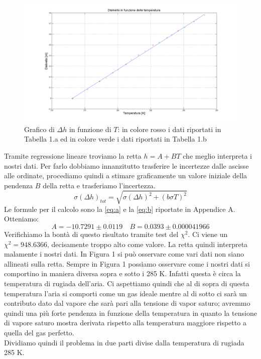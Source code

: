 \begin{figure}[H]
\centering
\includegraphics[width=\textwidth]{img/1}
\caption{Grafico di $\Delta h$ in funzione di $T$: in colore rosso i dati riportati in Tabella 1.a ed in colore verde i dati riportati in Tabella 1.b }
\end{figure}

Tramite regressione lineare troviamo la retta $h = A+BT$ che meglio interpreta i nostri dati. 
Per farlo dobbiamo innanzitutto trasferire le incertezze dalle ascisse alle ordinate, procediamo quindi a stimare graficamente un valore iniziale della pendenza $B$ della retta e trasferiamo l'incertezza.
\begin{equation}
\label{eq:propagazione}
\sigma(\Delta h)_{tot} = \sqrt{\sigma(\Delta h)^2 + (b\sigma T)^2}
\end{equation}
Le formule per il calcolo sono la \eqref{eq:a} e la \eqref{eq:b} riportate in Appendice A. 
Otteniamo:
\[A = -10.7291 \pm 0.0119 \quad  B = 0.0393\pm  0.000041966\]
Verifichiamo la bontà di questo risultato tramite test del $\chi^2$. 
Ci viene un $\chi^2 = 948.6366$, decisamente troppo alto come valore.
La retta quindi interpreta malamente i nostri dati. 
In Figura 1 si può osservare come vari dati non siano allineati sulla retta. 
Sempre in Figura 1 possiamo osservare come i nostri dati si comportino in maniera diversa sopra e sotto i 285 K. 
Infatti questa è circa la temperatura di rugiada dell'aria. 
Ci aspettiamo quindi che al di sopra di questa temperatura l'aria si comporti come un gas ideale mentre al di sotto ci sarà un contributo dato dal vapore che sarà pari alla tensione di vapor saturo; avremmo quindi una più forte pendenza in funzione della temperatura in quanto la tensione di vapore saturo mostra derivata rispetto alla temperatura maggiore rispetto a quella del gas perfetto.\\
\newline
Dividiamo quindi il problema in due parti divise dalla temperatura di rugiada 285 K.

